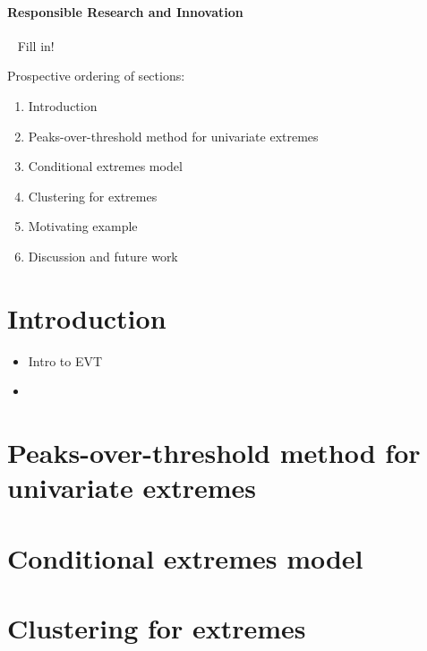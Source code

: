 \documentclass{article}
\numberwithin{equation}{section}
\begin{document}
\begin{center}
\paragraph{Responsible Research and Innovation} ~\linebreak
{}
Fill in!

\end{center}

\newpage

\tableofcontents

\newpage

Prospective ordering of sections:
\begin{enumerate}
  \item Introduction
  \item Peaks-over-threshold method for univariate extremes
  \item Conditional extremes model
  \item Clustering for extremes
  \item Motivating example
  \item Discussion and future work
\end{enumerate}

\section{Introduction}\label{sec:intro}

\begin{itemize}
  \item Intro to EVT
  \item
\end{itemize}

\section{Peaks-over-threshold method for univariate extremes}\label{sec:uni}

\section{Conditional extremes model}\label{sec:ce}

\section{Clustering for extremes}\label{sec:clustering}
\end{document}
